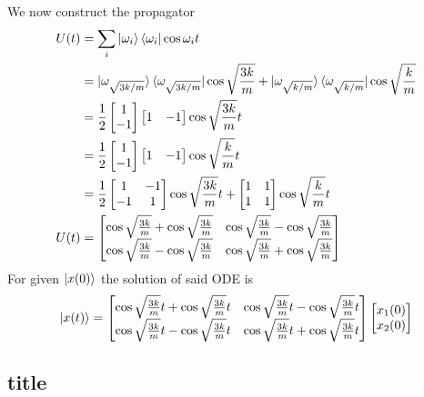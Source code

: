 \documentclass[../main.tex]{subfiles}
\begin{document}
We now construct the propagator
\begin{align*}
	U(t) & =\sum_i \ket{\omega_i} \bra{\omega_i} \cos \omega_i t                                                                                                    \\
	     & =\ket{\omega_{\sqrt{3k/m}}}\bra{\omega_{\sqrt{3k/m}}}\cos \sqrt{\frac{3k}{m}}+\ket{\omega_{\sqrt{k/m}}}\bra{\omega_{\sqrt{k/m}}}\cos \sqrt{\frac{k }{m}} \\
	     & =\frac{1}{2}
	\begin{bmatrix}
		1 \\-1
	\end{bmatrix}
	\begin{bmatrix}
		1 & -1
	\end{bmatrix}
	\cos \sqrt{\frac{3k }{m }}t\\
    &=	\frac{1}{2}
	\begin{bmatrix}
		1 \\-1
	\end{bmatrix}
	\begin{bmatrix}
		1 & -1
	\end{bmatrix}
	\cos \sqrt{\frac{k }{m }}t\\
	     & =\frac{1}{2}
	\begin{bmatrix}
		1  & -1 \\
		-1 & 1  \\
	\end{bmatrix}
	\cos \sqrt{\frac{3k }{m }}t
	+
	\begin{bmatrix}
		1 & 1 \\
		1 & 1 \\
	\end{bmatrix}
	\cos \sqrt{\frac{k }{m }}t\\
	U(t) & =
	\begin{bmatrix}
		\cos \sqrt{\frac{3k }{m }}+\cos \sqrt{\frac{3k }{m }} & \cos \sqrt{\frac{3k }{m }}-\cos \sqrt{\frac{3k }{m }}\\
		\cos \sqrt{\frac{3k }{m }}-\cos \sqrt{\frac{3k }{m }} & \cos \sqrt{\frac{3k }{m }}+\cos \sqrt{\frac{3k }{m }}
	\end{bmatrix}
\end{align*}
For given $\ket{x(0)}$ the solution of said ODE is 
\begin{equation*}
    \ket{x(t)}=
    \begin{bmatrix}
		\cos \sqrt{\frac{3k }{m }}t+\cos \sqrt{\frac{3k }{m }}t & \cos \sqrt{\frac{3k }{m }}t-\cos \sqrt{\frac{3k }{m }}t\\
		\cos \sqrt{\frac{3k }{m }}t-\cos \sqrt{\frac{3k }{m }} t& \cos \sqrt{\frac{3k }{m }}t+\cos \sqrt{\frac{3k }{m }}t
	\end{bmatrix}
    \begin{bmatrix}
        x_1(0)\\
        x_2(0)\\
    \end{bmatrix}
\end{equation*}

\subsection*{title}
\end{document}
